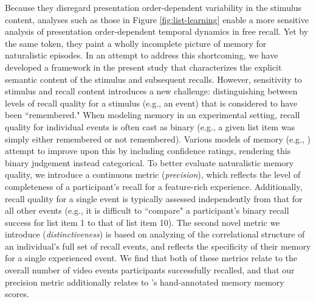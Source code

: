 \documentclass{article}
\begin{document}
Because they disregard presentation order-dependent variability in the stimulus content, analyses such as those in Figure \ref{fig:list-learning} enable a more sensitive analysis of presentation order-dependent temporal dynamics in free recall. Yet by the same token, they paint a wholly incomplete picture of memory for naturalistic episodes.  In an attempt to address this shortcoming, we have developed a framework in the present study that characterizes the explicit semantic content of the stimulus and subsequent recalls.  However, sensitivity to stimulus and recall content introduces a new challenge: distinguishing between levels of recall quality for a stimulus (e.g., an event) that is considered to have been ``remembered."  When modeling memory in an experimental setting, recall quality for individual events is often cast as binary (e.g., a given list item was simply either remembered or not remembered).  Various models of memory (e.g., \citealp{Yone02}) attempt to improve upon this by including confidence ratings, rendering this binary judgement instead categorical.  To better evaluate naturalistic memory quality, we introduce a continuous metric (\textit{precision}), which reflects the level of completeness of a participant's recall for a feature-rich experience.  Additionally, recall quality for a single event is typically assessed independently from that for all other events (e.g., it is difficult to ``compare" a participant's binary recall success for list item 1 to that of list item 10).  The second novel metric we introduce (\textit{distinctiveness}) is based on analyzing of the correlational structure of an individual's full set of recall events, and reflects the specificity of their memory for a single experienced event.  We find that both of these metrics relate to the overall number of video events participants successfully recalled, and that our precision metric additionally relates to \cite{ChenEtal17}'s hand-annotated memory memory scores.
\end{document}
